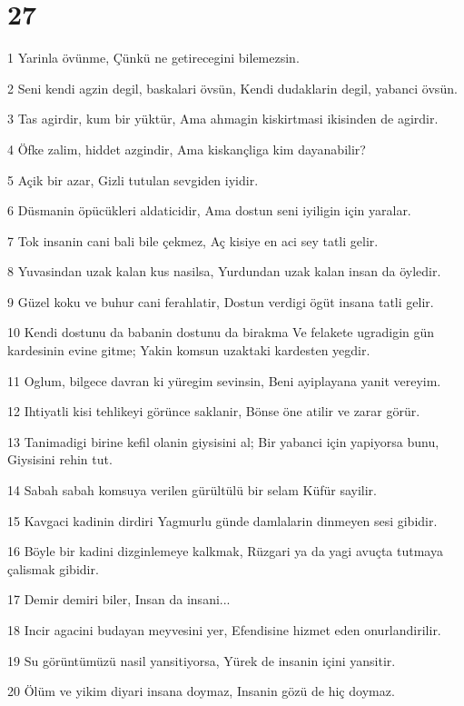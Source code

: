 \chapter{27}

\par 1 Yarinla övünme, Çünkü ne getirecegini bilemezsin.
\par 2 Seni kendi agzin degil, baskalari övsün, Kendi dudaklarin degil, yabanci övsün.
\par 3 Tas agirdir, kum bir yüktür, Ama ahmagin kiskirtmasi ikisinden de agirdir.
\par 4 Öfke zalim, hiddet azgindir, Ama kiskançliga kim dayanabilir?
\par 5 Açik bir azar, Gizli tutulan sevgiden iyidir.
\par 6 Düsmanin öpücükleri aldaticidir, Ama dostun seni iyiligin için yaralar.
\par 7 Tok insanin cani bali bile çekmez, Aç kisiye en aci sey tatli gelir.
\par 8 Yuvasindan uzak kalan kus nasilsa, Yurdundan uzak kalan insan da öyledir.
\par 9 Güzel koku ve buhur cani ferahlatir, Dostun verdigi ögüt insana tatli gelir.
\par 10 Kendi dostunu da babanin dostunu da birakma Ve felakete ugradigin gün kardesinin evine gitme; Yakin komsun uzaktaki kardesten yegdir.
\par 11 Oglum, bilgece davran ki yüregim sevinsin, Beni ayiplayana yanit vereyim.
\par 12 Ihtiyatli kisi tehlikeyi görünce saklanir, Bönse öne atilir ve zarar görür.
\par 13 Tanimadigi birine kefil olanin giysisini al; Bir yabanci için yapiyorsa bunu, Giysisini rehin tut.
\par 14 Sabah sabah komsuya verilen gürültülü bir selam Küfür sayilir.
\par 15 Kavgaci kadinin dirdiri Yagmurlu günde damlalarin dinmeyen sesi gibidir.
\par 16 Böyle bir kadini dizginlemeye kalkmak, Rüzgari ya da yagi avuçta tutmaya çalismak gibidir.
\par 17 Demir demiri biler, Insan da insani...
\par 18 Incir agacini budayan meyvesini yer, Efendisine hizmet eden onurlandirilir.
\par 19 Su görüntümüzü nasil yansitiyorsa, Yürek de insanin içini yansitir.
\par 20 Ölüm ve yikim diyari insana doymaz, Insanin gözü de hiç doymaz.
